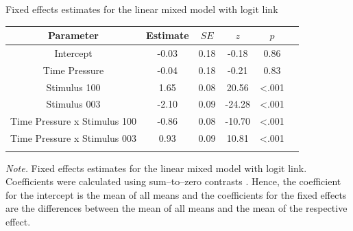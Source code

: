 \documentclass[a4paper,man,natbib]{apa6}
\begin{document}
\begin{center}
\begin{threeparttable}
\caption{Fixed effects estimates for the linear mixed model with logit link}
\label{tab:estimates}
\begin{tabular*}{\textwidth}{c @{\extracolsep{\fill}} ccccc}
\toprule
\multicolumn{1}{c}{Parameter} & \multicolumn{1}{c}{Estimate} & \multicolumn{1}{c}{$SE$} & \multicolumn{1}{c}{$z$} & \multicolumn{1}{c}{$p$}\\
\midrule
\addlinespace
Intercept & -0.03 & 0.18 & -0.18 & 0.86\\
Time Pressure & -0.04 & 0.18 & -0.21 & 0.83\\
Stimulus 100 & 1.65 & 0.08 & 20.56 & <.001\\
Stimulus 003 & -2.10 & 0.09 & -24.28 & <.001\\
Time Pressure x Stimulus 100 & -0.86 & 0.08 & -10.70 & <.001\\
Time Pressure x Stimulus 003 & 0.93 & 0.09 & 10.81 & <.001\\
\bottomrule
\addlinespace
\end{tabular*}
\begin{tablenotes}[para]
\textit{Note.} Fixed effects estimates for the linear mixed model with logit link. Coefficients were calculated using sum--to--zero contrasts \citep{singmann2017introduction}. Hence, the coefficient for the intercept is the mean of all means and the coefficients for the fixed effects are the differences between the mean of all means and the mean of the respective effect.
\end{tablenotes}
\end{threeparttable}
\end{center}
\vspace{\baselineskip}
\end{document}
